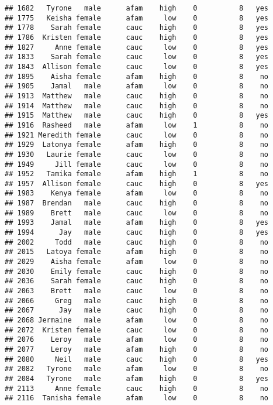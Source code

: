 \documentclass[
]{article}
\begin{document}
\begin{verbatim}
## 1682   Tyrone   male      afam    high    0          8   yes
## 1775   Keisha female      afam     low    0          8   yes
## 1778    Sarah female      cauc    high    0          8   yes
## 1786  Kristen female      cauc    high    0          8   yes
## 1827     Anne female      cauc     low    0          8   yes
## 1833    Sarah female      cauc     low    0          8   yes
## 1843  Allison female      cauc     low    0          8   yes
## 1895    Aisha female      afam    high    0          8    no
## 1905    Jamal   male      afam     low    0          8    no
## 1913  Matthew   male      cauc    high    0          8    no
## 1914  Matthew   male      cauc    high    0          8    no
## 1915  Matthew   male      cauc    high    0          8   yes
## 1916  Rasheed   male      afam     low    1          8    no
## 1921 Meredith female      cauc     low    0          8    no
## 1929  Latonya female      afam    high    0          8    no
## 1930   Laurie female      cauc     low    0          8    no
## 1949     Jill female      cauc     low    0          8    no
## 1952   Tamika female      afam    high    1          8    no
## 1957  Allison female      cauc    high    0          8   yes
## 1983    Kenya female      afam     low    0          8    no
## 1987  Brendan   male      cauc    high    0          8    no
## 1989    Brett   male      cauc     low    0          8    no
## 1993    Jamal   male      afam    high    0          8   yes
## 1994      Jay   male      cauc    high    0          8   yes
## 2002     Todd   male      cauc    high    0          8    no
## 2015   Latoya female      afam    high    0          8    no
## 2029    Aisha female      afam     low    0          8    no
## 2030    Emily female      cauc    high    0          8    no
## 2036    Sarah female      cauc    high    0          8    no
## 2063    Brett   male      cauc     low    0          8    no
## 2066     Greg   male      cauc    high    0          8    no
## 2067      Jay   male      cauc    high    0          8    no
## 2068 Jermaine   male      afam     low    0          8    no
## 2072  Kristen female      cauc     low    0          8    no
## 2076    Leroy   male      afam     low    0          8    no
## 2077    Leroy   male      afam    high    0          8    no
## 2080     Neil   male      cauc    high    0          8   yes
## 2082   Tyrone   male      afam     low    0          8    no
## 2084   Tyrone   male      afam    high    0          8   yes
## 2113     Anne female      cauc    high    0          8    no
## 2116  Tanisha female      afam     low    0          8    no

\end{verbatim}
\end{document}
